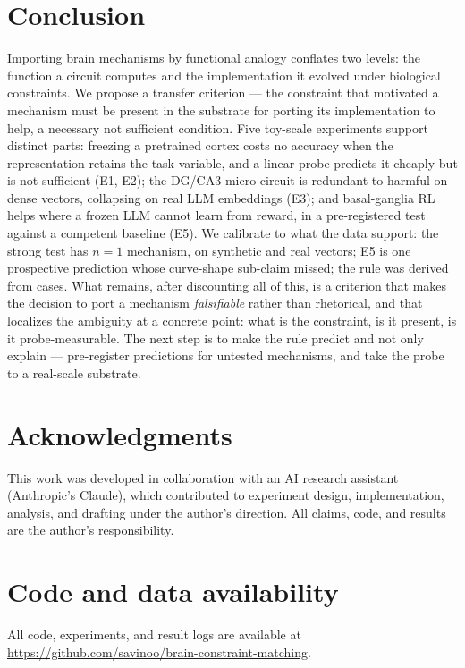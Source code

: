 \documentclass[11pt]{article}
\begin{document}
\section{Conclusion}
Importing brain mechanisms by functional analogy conflates two levels: the function a circuit computes and the implementation it evolved under biological constraints. We propose a transfer criterion --- the constraint that motivated a mechanism must be present in the substrate for porting its implementation to help, a necessary not sufficient condition. Five toy-scale experiments support distinct parts: freezing a pretrained cortex costs no accuracy when the representation retains the task variable, and a linear probe predicts it cheaply but is not sufficient (E1, E2); the DG/CA3 micro-circuit is redundant-to-harmful on dense vectors, collapsing on real LLM embeddings (E3); and basal-ganglia RL helps where a frozen LLM cannot learn from reward, in a pre-registered test against a competent baseline (E5). We calibrate to what the data support: the strong test has $n{=}1$ mechanism, on synthetic and real vectors; E5 is one prospective prediction whose curve-shape sub-claim missed; the rule was derived from cases. What remains, after discounting all of this, is a criterion that makes the decision to port a mechanism \emph{falsifiable} rather than rhetorical, and that localizes the ambiguity at a concrete point: what is the constraint, is it present, is it probe-measurable. The next step is to make the rule predict and not only explain --- pre-register predictions for untested mechanisms, and take the probe to a real-scale substrate.

\section*{Acknowledgments}
This work was developed in collaboration with an AI research assistant (Anthropic's Claude), which contributed to experiment design, implementation, analysis, and drafting under the author's direction. All claims, code, and results are the author's responsibility.

\section*{Code and data availability}
All code, experiments, and result logs are available at \url{https://github.com/savinoo/brain-constraint-matching}.



\end{document}
